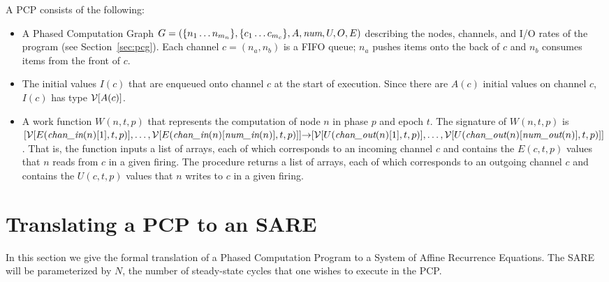 A PCP consists of the following:
\begin{itemize}

\item A Phased Computation Graph $G = (\{n_1 \dots n_{m_n}\}, \{c_1
\dots c_{m_c}\}, A, \mbox{\it num}, U, O, E)$ describing the nodes,
channels, and I/O rates of the program (see Section~\ref{sec:pcg}).
Each channel $c = (n_a, n_b)$ is a FIFO queue; $n_a$ pushes items onto
the back of $c$ and $n_b$ consumes items from the front of $c$.

\item The initial values $I(c)$ that are enqueued onto channel $c$ at
the start of execution.  Since there are $A(c)$ initial values on
channel $c$, $I(c)$ has type ${\cal V}[A(c)]$.


\item A work function $W(n, t, p)$ that represents the computation of
node $n$ in phase $p$ and epoch $t$.  The signature of $W(n, t, p)$ is
$[{\cal V}[E(\mbox{\it chan\_in}(n)[1], t, p)], \dots, {\cal
V}[E(\mbox{\it chan\_in}(n)[\mbox{\it num\_in}(n)], t, p)]] {\small \rightarrow} [ {\cal
V}[U(\mbox{\it chan\_out}(n)[1], t, p)], \dots, {\cal
V}[U(\mbox{\it chan\_out}(n)[\mbox{\it num\_out}(n)], t, p)]]$.  That is, the function
inputs a list of arrays, each of which corresponds to an incoming
channel $c$ and contains the $E(c,t,p)$ values that $n$ reads from $c$
in a given firing.  The procedure returns a list of arrays, each of
which corresponds to an outgoing channel $c$ and contains the
$U(c,t,p)$ values that $n$ writes to $c$ in a given firing.

\end{itemize}


\section{Translating a PCP to an SARE}

In this section we give the formal translation of a Phased Computation
Program to a System of Affine Recurrence Equations.  The SARE will be
parameterized by $N$, the number of steady-state cycles that one
wishes to execute in the PCP.

